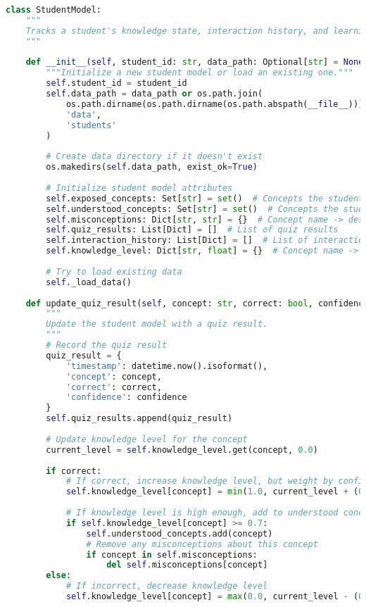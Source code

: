 \begin{lstlisting}[language=Python, caption=Student Model Implementation, label=lst:student-model]
class StudentModel:
    """
    Tracks a student's knowledge state, interaction history, and learning progress.
    """
    
    def __init__(self, student_id: str, data_path: Optional[str] = None):
        """Initialize a new student model or load an existing one."""
        self.student_id = student_id
        self.data_path = data_path or os.path.join(
            os.path.dirname(os.path.dirname(os.path.abspath(__file__))), 
            'data', 
            'students'
        )
        
        # Create data directory if it doesn't exist
        os.makedirs(self.data_path, exist_ok=True)
        
        # Initialize student model attributes
        self.exposed_concepts: Set[str] = set()  # Concepts the student has seen
        self.understood_concepts: Set[str] = set()  # Concepts the student understands
        self.misconceptions: Dict[str, str] = {}  # Concept name -> description of misconception
        self.quiz_results: List[Dict] = []  # List of quiz results
        self.interaction_history: List[Dict] = []  # List of interactions
        self.knowledge_level: Dict[str, float] = {}  # Concept name -> knowledge level (0.0 to 1.0)
        
        # Try to load existing data
        self._load_data()
    
    def update_quiz_result(self, concept: str, correct: bool, confidence: float) -> None:
        """
        Update the student model with a quiz result.
        """
        # Record the quiz result
        quiz_result = {
            'timestamp': datetime.now().isoformat(),
            'concept': concept,
            'correct': correct,
            'confidence': confidence
        }
        self.quiz_results.append(quiz_result)
        
        # Update knowledge level for the concept
        current_level = self.knowledge_level.get(concept, 0.0)
        
        if correct:
            # If correct, increase knowledge level, but weight by confidence
            self.knowledge_level[concept] = min(1.0, current_level + (0.2 * confidence))
            
            # If knowledge level is high enough, add to understood concepts
            if self.knowledge_level[concept] >= 0.7:
                self.understood_concepts.add(concept)
                # Remove any misconceptions about this concept
                if concept in self.misconceptions:
                    del self.misconceptions[concept]
        else:
            # If incorrect, decrease knowledge level
            self.knowledge_level[concept] = max(0.0, current_level - (0.1 * confidence))
            

\end{lstlisting}
